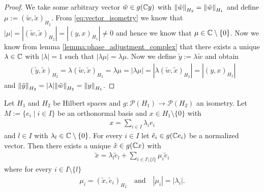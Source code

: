 \begin{proof}
	We take some arbitrary vector $\tilde{w} \in g(\C y)$ with $\norm[H_2]{\tilde{w}} = \norm[H_1]{\tilde{w}}$ and define $\mu := (\tilde{w}, \tilde{x})_{H_2}$. From \eqref{eq:vector_isometry} we know that $|\mu| = |(\tilde{w},\tilde{x})_{H_2}| = |(y,x)_{H_1}| \neq 0$ and hence we know that $\mu \in \C \setminus \{0\}$. Now we know from lemma \ref{lemma:phase_adjustment_complex} that there exists a unique $\lambda \in \C$ with $|\lambda| = 1$ such that $|\lambda \mu| = \lambda \mu$. Now we define $\tilde{y} := \lambda \tilde{w}$ and obtain
	\begin{align*}
		(\tilde{y}, \tilde{x})_{H_2} = \lambda (\tilde{w}, \tilde{x})_{H_2} = \lambda \mu = |\lambda \mu| = |\lambda (\tilde{w}, \tilde{x})_{H_2}| = |(y,x)_{H_2}|
	\end{align*}
	and $\norm[H_2]{\tilde{y}} = |\lambda| \norm[H_2]{\tilde{w}} = \norm[H_1]{y}$. 
\end{proof}


\begin{lemma} \label{lemma:aux_main}
	Let $H_1$ and $H_2$ be Hilbert spaces and $g: \mathcal{P}(H_1) \to \mathcal{P}(H_2)$ an isometry. Let $M := \{e_i \mid i \in I\}$ be an orthonormal basis and $x \in H_1 \setminus \{0\}$ with
	\begin{align*}
		x = \sum_{i \in I} \lambda_i e_i
	\end{align*} 
	and $l \in I$ with $\lambda_l \in \C \setminus \{0\}$. For every $i \in I$ let $\tilde{e}_i \in g(\C e_i)$ be a normalized vector. Then there exists a unique $\tilde{x} \in g(\C x)$ with 
	\begin{align*}
		\tilde{x} = \lambda_l \tilde{e}_l + \sum_{i \in I \setminus \{l\}} \mu_i \tilde{e}_i
	\end{align*}
	where for every $i \in I \setminus \{l\}$
	\begin{align*}
		\mu_i = (\tilde{x}, \tilde{e}_i)_{H_2} \quad \text{and} \quad |\mu_i| = |\lambda_i|.
	\end{align*}
\end{lemma}

